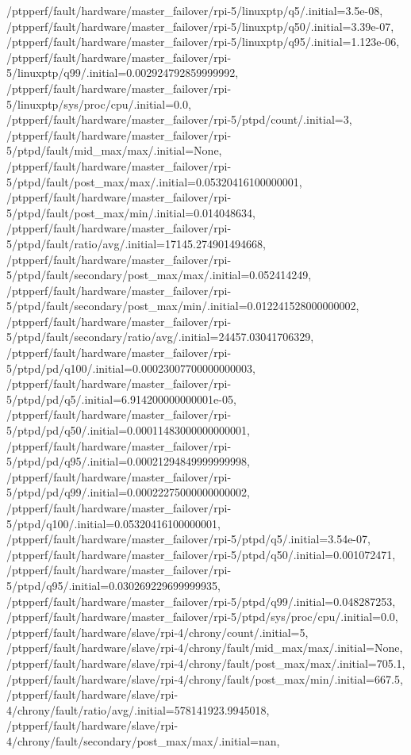 {    /ptpperf/fault/hardware/master_failover/rpi-5/linuxptp/q5/.initial=3.5e-08,
    /ptpperf/fault/hardware/master_failover/rpi-5/linuxptp/q50/.initial=3.39e-07,
    /ptpperf/fault/hardware/master_failover/rpi-5/linuxptp/q95/.initial=1.123e-06,
    /ptpperf/fault/hardware/master_failover/rpi-5/linuxptp/q99/.initial=0.002924792859999992,
    /ptpperf/fault/hardware/master_failover/rpi-5/linuxptp/sys/proc/cpu/.initial=0.0,
    /ptpperf/fault/hardware/master_failover/rpi-5/ptpd/count/.initial=3,
    /ptpperf/fault/hardware/master_failover/rpi-5/ptpd/fault/mid_max/max/.initial=None,
    /ptpperf/fault/hardware/master_failover/rpi-5/ptpd/fault/post_max/max/.initial=0.05320416100000001,
    /ptpperf/fault/hardware/master_failover/rpi-5/ptpd/fault/post_max/min/.initial=0.014048634,
    /ptpperf/fault/hardware/master_failover/rpi-5/ptpd/fault/ratio/avg/.initial=17145.274901494668,
    /ptpperf/fault/hardware/master_failover/rpi-5/ptpd/fault/secondary/post_max/max/.initial=0.052414249,
    /ptpperf/fault/hardware/master_failover/rpi-5/ptpd/fault/secondary/post_max/min/.initial=0.012241528000000002,
    /ptpperf/fault/hardware/master_failover/rpi-5/ptpd/fault/secondary/ratio/avg/.initial=24457.03041706329,
    /ptpperf/fault/hardware/master_failover/rpi-5/ptpd/pd/q100/.initial=0.00023007700000000003,
    /ptpperf/fault/hardware/master_failover/rpi-5/ptpd/pd/q5/.initial=6.914200000000001e-05,
    /ptpperf/fault/hardware/master_failover/rpi-5/ptpd/pd/q50/.initial=0.00011483000000000001,
    /ptpperf/fault/hardware/master_failover/rpi-5/ptpd/pd/q95/.initial=0.00021294849999999998,
    /ptpperf/fault/hardware/master_failover/rpi-5/ptpd/pd/q99/.initial=0.00022275000000000002,
    /ptpperf/fault/hardware/master_failover/rpi-5/ptpd/q100/.initial=0.05320416100000001,
    /ptpperf/fault/hardware/master_failover/rpi-5/ptpd/q5/.initial=3.54e-07,
    /ptpperf/fault/hardware/master_failover/rpi-5/ptpd/q50/.initial=0.001072471,
    /ptpperf/fault/hardware/master_failover/rpi-5/ptpd/q95/.initial=0.030269229699999935,
    /ptpperf/fault/hardware/master_failover/rpi-5/ptpd/q99/.initial=0.048287253,
    /ptpperf/fault/hardware/master_failover/rpi-5/ptpd/sys/proc/cpu/.initial=0.0,
    /ptpperf/fault/hardware/slave/rpi-4/chrony/count/.initial=5,
    /ptpperf/fault/hardware/slave/rpi-4/chrony/fault/mid_max/max/.initial=None,
    /ptpperf/fault/hardware/slave/rpi-4/chrony/fault/post_max/max/.initial=705.1,
    /ptpperf/fault/hardware/slave/rpi-4/chrony/fault/post_max/min/.initial=667.5,
    /ptpperf/fault/hardware/slave/rpi-4/chrony/fault/ratio/avg/.initial=578141923.9945018,
    /ptpperf/fault/hardware/slave/rpi-4/chrony/fault/secondary/post_max/max/.initial=nan,
}
